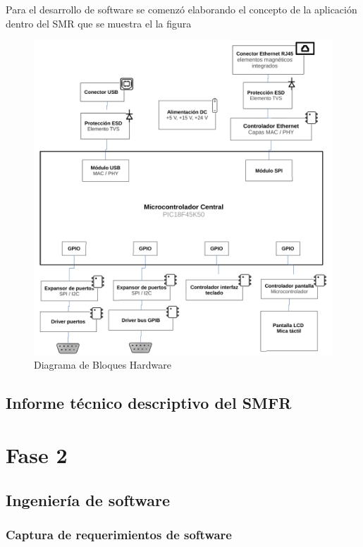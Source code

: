 \documentclass[paper=letter,oneside,fontsize=12pt, parskip=full]{article}
\begin{document}
	Para el desarrollo de software se comenzó elaborando el concepto de la aplicación dentro del SMR que se muestra el la figura 
	
	\begin{figure}[!h]
		\begin{center}
			\includegraphics[width=18cm]{Imagenes/DiagramaBloquesHardware2.pdf}
			\caption{Diagrama de Bloques Hardware}
			\label{Fig:Diagrama de Bloques de Hardware}
		\end{center}
	\end{figure}	
	
	
	\subsection{Informe técnico descriptivo del SMFR}	
	
	\section{Fase 2}
	
	\subsection{Ingeniería de software}	
	
	\subsubsection{Captura de requerimientos de software}
	
\end{document}
